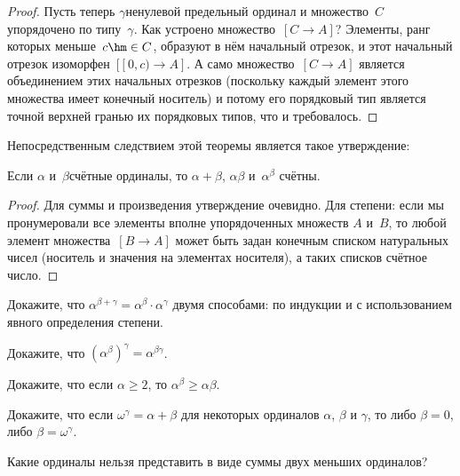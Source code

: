 \begin{proof}
Пусть теперь $\gamma$\т ненулевой предельный ординал и множество~$C$ упорядочено
по типу~$\gamma$. Как устроено множество~${[C\to A]}$?
Элементы, ранг которых меньше~$c\hm\in C$, образуют в нём
начальный отрезок, и этот начальный отрезок изоморфен~$[[0,c)\to A]$.
А само множество~$[C\to A]$ является
объединением этих начальных отрезков (поскольку каждый элемент этого множества
имеет конечный носитель) и потому его
порядковый тип является точной верхней гранью их
порядковых типов, что и требовалось.
\end{proof}

Непосредственным следствием этой теоремы является такое утверждение:
\begin{theorem}
Если $\alpha$ и~$\beta$\т счётные ординалы, то
$\alpha+\beta$, $\alpha\beta$ и~$\alpha^\beta$ счётны.
\end{theorem}

\begin{proof}
Для суммы и произведения утверждение очевидно.
Для степени: если мы пронумеровали все элементы вполне упорядоченных
множеств $A$ и~$B$, то любой элемент множества~$[B\to A]$
может быть задан конечным списком натуральных
чисел (носитель и значения на элементах носителя),
а таких списков счётное число.
\end{proof}

\problskip

\begin{problem}
Докажите, что $\alpha^{\beta+\gamma}=\alpha^\beta\cdot\alpha^\gamma$ двумя
способами: по индукции и с использованием явного определения степени.
\end{problem}

\begin{problem}
Докажите, что $(\alpha^\beta)^\gamma=\alpha^{\beta\gamma}$.
\end{problem}

\begin{problem}
Докажите, что если $\alpha\ge2$, то $\alpha^\beta\ge\alpha\beta$.
\end{problem}

\begin{problem}
Докажите, что если $\omega^\gamma=\alpha+\beta$ для некоторых
ординалов $\alpha$, $\beta$ и $\gamma$, то либо $\beta=0$, либо
$\beta=\omega^\gamma$.
\end{problem}

\begin{problem}
Какие ординалы нельзя представить в виде суммы двух меньших ординалов?
\end{problem}

